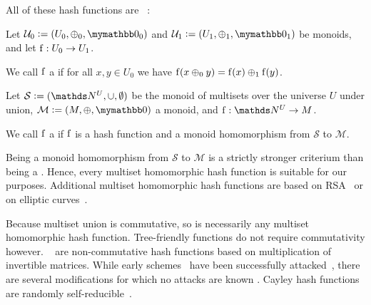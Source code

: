 \documentclass[conference]{IEEEtran}
\begin{document}
All of these hash functions are ~\cite{clarke2003incremental}:

\begin{definition}
Let $\mathcal{U}_0 \defeq (U_0, \groupaddsym_0, \neutraladd_0)$ and $\mathcal{U}_1 \defeq (U_1, \groupaddsym_1, \neutraladd_1)$ be monoids, and let ${\operatorname{f}}: {U_0} \rightarrow {U_1}$.

We call $\operatorname{f}$ a  if for all $x, y \in U_0$ we have $\operatorname{f}(x \oplus_0 y) = \operatorname{f}(x) \oplus_1 \operatorname{f}(y)$.
\end{definition}

\begin{definition}
Let $\mathcal{S} \defeq (\N^U, \cup, \emptyset)$ be the monoid of multisets over the universe $U$ under union, $\mathcal{M} \defeq (M, \groupaddsym, \neutraladd)$ a monoid, and $\fun{\f}{\N^U}{M}$.

We call $\operatorname{f}$ a  if $\operatorname{f}$ is a hash function and a monoid homomorphism from $\mathcal{S}$ to $\mathcal{M}$.
\end{definition}

Being a monoid homomorphism from $\mathcal{S}$ to $\mathcal{M}$ is a strictly stronger criterium than being a \somewhatmorphism{}. Hence, every multiset homomorphic hash function is suitable for our purposes. Additional multiset homomorphic hash functions are based on RSA~\cite{cathalo2009comparing} or on elliptic curves~\cite{maitin2017elliptic}.

Because multiset union is commutative, so is necessarily any multiset homomorphic hash function. Tree-friendly functions do not require commutativity however. ~\cite{zemor1991hash}\cite{petit2011rubik} are non-commutative hash functions based on multiplication of invertible matrices. While early schemes~\cite{tillich1994hashing} have been successfully attacked~\cite{grassl2011cryptanalysis}\cite{petit2010preimages}, there are several modifications for which no attacks are known \cite{petit2009graph}\cite{bromberg2017navigating}\cite{sosnovski2016cayley}. Cayley hash functions are randomly self-reducible~\cite{mullan2016text}.

\end{document}
